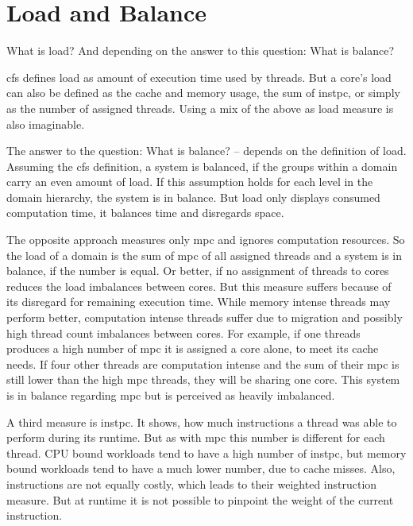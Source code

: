 \section{Load and Balance}
\label{design:load}


What is load? 
And depending on the answer to this question: What is balance?

\gls{cfs} defines load as amount of execution time used by threads.
But a core's load can also be defined as
the cache and memory usage, the sum of \gls{instpc}, or simply as the number of
assigned threads.
Using a mix of the above as load measure is also imaginable.

The answer to the question: What is balance? -- depends on the definition of
load.
Assuming the \gls{cfs} definition, a system is balanced, if the groups within a
domain carry an even amount of load.
If this assumption holds for each level in the domain hierarchy, the system is
in balance.
But load only displays consumed computation time, it balances time and
disregards space.

The opposite approach measures only \gls{mpc} and ignores computation
resources.
So the load of a domain is the sum of \gls{mpc} of all assigned threads and a
system is in balance, if the number is equal.
Or better, if no assignment of threads to cores reduces the load imbalances 
between cores.
But this measure suffers because of its disregard for remaining execution time.
While memory intense threads may perform better, computation intense threads
suffer due to migration and possibly high thread count imbalances between
cores.
For example, if one threads produces a high number of \gls{mpc} it is assigned a
core alone, to meet its cache needs.
If four other threads are computation intense and the sum of their \gls{mpc} is
still lower than the high \gls{mpc} threads, they will be sharing one core.
This system is in balance regarding \gls{mpc} but is perceived as heavily
imbalanced.

A third measure is \gls{instpc}.
It shows, how much instructions a thread was able to perform during its
runtime.
But as with \gls{mpc} this number is different for each thread.
CPU bound workloads tend to have a high number of \gls{instpc},
but memory bound workloads tend to have a much lower number, due to cache
misses.
Also, instructions are not equally costly, which leads
\citeauthor{snavely_symbiotic_2000} to their weighted instruction measure.
But at runtime it is not possible to pinpoint the weight of the current
instruction.

